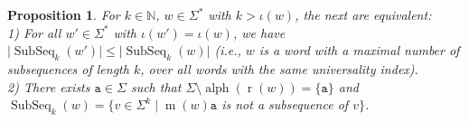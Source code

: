 \documentclass[10pt,a4paper]{amsart}
\newcommand{\N}{\mathbb{N}}
\def\ta{\mathtt{a}}
\def\r{\operatorname{r}}
\def\m{\operatorname{m}}
\DeclareMathOperator{\al}{alph}
\DeclareMathOperator\ScatFact{SubSeq}
\theoremstyle{plain}
\newtheorem{proposition}{Proposition}
\theoremstyle{definition}
\begin{document}
\begin{proposition}\label{corollary:min-absent-sf-main-property}
    For $k\in\N$, $w \in \Sigma^*$ with $k > \iota(w)$, the next are equivalent:\\
    1) For all  $w' \in \Sigma^*$  with $\iota(w')=\iota(w)$, we have $\vert \ScatFact_k(w') \vert \leq \vert \ScatFact_k(w) \vert$ (i.e., $w$ is a word with a maximal number of subsequences of length $k$, over all words with the same universality index).\\
    2) There exists $\ta\in \Sigma$ such that $\Sigma \setminus \al(\r(w))=\{\ta\}$  and $\ScatFact_k(w)=\{v\in \Sigma^k\mid \m(w)\ta$ is not a subsequence of $v\}$.
    
    
%     
%     
%     
%     

    
\end{proposition}
\end{document}
